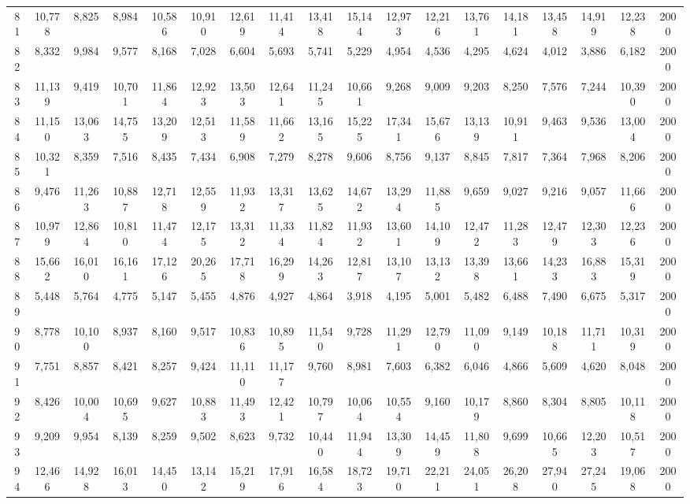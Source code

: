 {\begin{longtable}{ >{\tiny}cccccccccccccccccc}
81  & 10,778 & 8,825  & 8,984  & 10,586 & 10,910 & 12,619 & 11,414 & 13,418 & 15,144 & 12,973 & 12,216 & 13,761 & 14,181 & 13,458 & 14,919 & 12,238 & 2000 \\
82  & 8,332  & 9,984  & 9,577  & 8,168  & 7,028  & 6,604  & 5,693  & 5,741  & 5,229  & 4,954  & 4,536  & 4,295  & 4,624  & 4,012  & 3,886  & 6,182  & 2000 \\
83  & 11,139 & 9,419  & 10,701 & 11,864 & 12,923 & 13,503 & 12,641 & 11,245 & 10,661 & 9,268  & 9,009  & 9,203  & 8,250  & 7,576  & 7,244  & 10,390 & 2000 \\
84  & 11,150 & 13,063 & 14,755 & 13,209 & 12,513 & 11,589 & 11,662 & 13,165 & 15,225 & 17,341 & 15,676 & 13,139 & 10,911 & 9,463  & 9,536  & 13,004 & 2000 \\
85  & 10,321 & 8,359  & 7,516  & 8,435  & 7,434  & 6,908  & 7,279  & 8,278  & 9,606  & 8,756  & 9,137  & 8,845  & 7,817  & 7,364  & 7,968  & 8,206  & 2000 \\
86  & 9,476  & 11,263 & 10,887 & 12,718 & 12,559 & 11,932 & 13,317 & 13,625 & 14,672 & 13,294 & 11,885 & 9,659  & 9,027  & 9,216  & 9,057  & 11,666 & 2000 \\
87  & 10,979 & 12,864 & 10,810 & 11,474 & 12,175 & 13,312 & 11,334 & 11,824 & 11,932 & 13,601 & 14,109 & 12,472 & 11,283 & 12,479 & 12,303 & 12,236 & 2000 \\
88  & 15,662 & 16,010 & 16,161 & 17,126 & 20,265 & 17,718 & 16,299 & 14,263 & 12,817 & 13,107 & 13,132 & 13,398 & 13,661 & 14,233 & 16,883 & 15,319 & 2000 \\
89  & 5,448  & 5,764  & 4,775  & 5,147  & 5,455  & 4,876  & 4,927  & 4,864  & 3,918  & 4,195  & 5,001  & 5,482  & 6,488  & 7,490  & 6,675  & 5,317  & 2000 \\
90  & 8,778  & 10,100 & 8,937  & 8,160  & 9,517  & 10,836 & 10,895 & 11,540 & 9,728  & 11,291 & 12,790 & 11,090 & 9,149  & 10,188 & 11,711 & 10,319 & 2000 \\
91  & 7,751  & 8,857  & 8,421  & 8,257  & 9,424  & 11,110 & 11,177 & 9,760  & 8,981  & 7,603  & 6,382  & 6,046  & 4,866  & 5,609  & 4,620  & 8,048  & 2000 \\
92  & 8,426  & 10,004 & 10,695 & 9,627  & 10,883 & 11,493 & 12,421 & 10,797 & 10,064 & 10,554 & 9,160  & 10,179 & 8,860  & 8,304  & 8,805  & 10,118 & 2000 \\
93  & 9,209  & 9,954  & 8,139  & 8,259  & 9,502  & 8,623  & 9,732  & 10,440 & 11,944 & 13,309 & 14,459 & 11,808 & 9,699  & 10,665 & 12,203 & 10,517 & 2000 \\
94  & 12,466 & 14,928 & 16,013 & 14,450 & 13,142 & 15,219 & 17,916 & 16,584 & 18,723 & 19,710 & 22,211 & 24,051 & 26,208 & 27,940 & 27,245 & 19,068 & 2000 \\

\end{longtable}}
